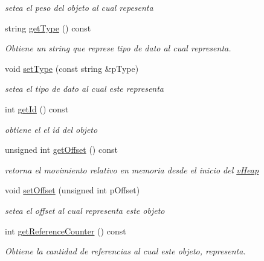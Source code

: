 \begin{DoxyCompactItemize}
\begin{DoxyCompactList}\small\item\em setea el peso del objeto al cual repesenta \end{DoxyCompactList}\item 
string \hyperlink{class_minimalism_bit_vector_ae2ade8544c4c57e92e5f5dd16add849b}{get\-Type} () const 
\begin{DoxyCompactList}\small\item\em Obtiene un string que represe tipo de dato al cual representa. \end{DoxyCompactList}\item 
void \hyperlink{class_minimalism_bit_vector_a15aad2b30f6e8c2e76bba5e617de351c}{set\-Type} (const string \&p\-Type)
\begin{DoxyCompactList}\small\item\em setea el tipo de dato al cual este representa \end{DoxyCompactList}\item 
int \hyperlink{class_minimalism_bit_vector_a166c2b2c6e84945e329310584ca89128}{get\-Id} () const 
\begin{DoxyCompactList}\small\item\em obtiene el el id del objeto \end{DoxyCompactList}\item 
unsigned int \hyperlink{class_minimalism_bit_vector_ae17a440748037ed78b67bf9a2f4aad1d}{get\-Offset} () const 
\begin{DoxyCompactList}\small\item\em retorna el movimiento relativo en memoria desde el inicio del \hyperlink{classv_heap}{v\-Heap} \end{DoxyCompactList}\item 
void \hyperlink{class_minimalism_bit_vector_ad9d6993d2a24b1f238f1896dd8ff04be}{set\-Offset} (unsigned int p\-Offset)
\begin{DoxyCompactList}\small\item\em setea el offset al cual representa este objeto \end{DoxyCompactList}\item 
int \hyperlink{class_minimalism_bit_vector_ab0c91d2ff39599b96ba7f0c52ed796d2}{get\-Reference\-Counter} () const 
\begin{DoxyCompactList}\small\item\em Obtiene la cantidad de referencias al cual este objeto, representa. \end{DoxyCompactList}\item 

\end{DoxyCompactItemize}
